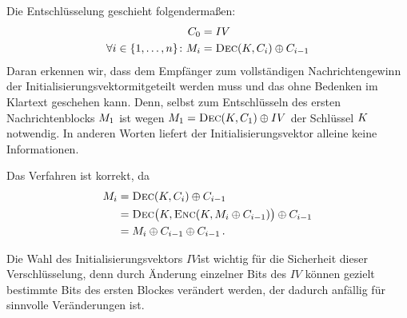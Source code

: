 Die Entschlüsselung geschieht folgendermaßen:
\begin{align*}
  C_0 &= IV\\
  \forall i \in \{1,\dots,n\}\colon M_i &= \textsc{Dec}(K, C_i) \oplus C_{i-1}
\end{align*}
Daran erkennen wir, dass dem Empfänger zum vollständigen
Nachrichtengewinn der Initialisierungsvektor\indexIV mitgeteilt werden
muss und das ohne Bedenken im Klartext geschehen kann. Denn, selbst zum
Entschlüsseln des ersten Nachrichtenblocks $M_{1}$ ist wegen
$M_{1} = \textsc{Dec}(K, C_{1}) \oplus IV$ der Schlüssel $K$
notwendig. In anderen Worten liefert der Initialisierungsvektor alleine
keine Informationen. 

Das Verfahren ist korrekt, da
\begin{align*}
  \begin{split}
    M_i &= \textsc{Dec}(K,C_i)\oplus C_{i-1}\\
    &= \textsc{Dec} \bigl(K,\textsc{Enc}(K,M_i\oplus C_{i-1})\bigr)
    \oplus C_{i-1}\\ 
    &= M_i\oplus C_{i-1}\oplus C_{i-1}\, .
  \end{split}
\end{align*}

Die Wahl des Initialisierungsvektors $IV$\indexIV ist wichtig für die
Sicherheit dieser Verschlüsselung, denn durch Änderung einzelner Bits
des $IV$ können gezielt bestimmte Bits des ersten Blockes verändert
werden, der dadurch anfällig für sinnvolle Veränderungen ist.

